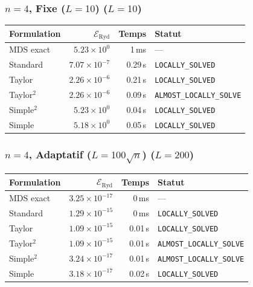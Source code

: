 \subsubsection{$n=4$, Fixe ($L{=}10$) ($L=10$)}
\begin{longtable}{@{}lrrl@{}}
  \toprule
  Formulation & $\mathcal{E}_{\mathrm{Ryd}}$ & Temps & Statut \\
  \midrule
  \endhead
  MDS exact & $5.23\times10^{0}$ & 1\,ms & --- \\
  Standard & $7.07\times10^{-7}$ & 0.29\,s & \texttt{LOCALLY\_SOLVED} \\
  Taylor & $2.26\times10^{-6}$ & 0.21\,s & \texttt{LOCALLY\_SOLVED} \\
  Taylor$^2$ & $2.26\times10^{-6}$ & 0.09\,s & \texttt{ALMOST\_LOCALLY\_SOLVE} \\
  Simple$^2$ & $5.23\times10^{0}$ & 0.04\,s & \texttt{LOCALLY\_SOLVED} \\
  Simple & $5.18\times10^{0}$ & 0.05\,s & \texttt{LOCALLY\_SOLVED} \\
  \bottomrule
\end{longtable}

\subsubsection{$n=4$, Adaptatif ($L{=}100\sqrt{n}$) ($L=200$)}
\begin{longtable}{@{}lrrl@{}}
  \toprule
  Formulation & $\mathcal{E}_{\mathrm{Ryd}}$ & Temps & Statut \\
  \midrule
  \endhead
  MDS exact & $3.25\times10^{-17}$ & 0\,ms & --- \\
  Standard & $1.29\times10^{-15}$ & 0\,ms & \texttt{LOCALLY\_SOLVED} \\
  Taylor & $1.09\times10^{-15}$ & 0.01\,s & \texttt{LOCALLY\_SOLVED} \\
  Taylor$^2$ & $1.09\times10^{-15}$ & 0.01\,s & \texttt{ALMOST\_LOCALLY\_SOLVE} \\
  Simple$^2$ & $3.24\times10^{-17}$ & 0.01\,s & \texttt{ALMOST\_LOCALLY\_SOLVE} \\
  Simple & $3.18\times10^{-17}$ & 0.02\,s & \texttt{LOCALLY\_SOLVED} \\
  \bottomrule
\end{longtable}

